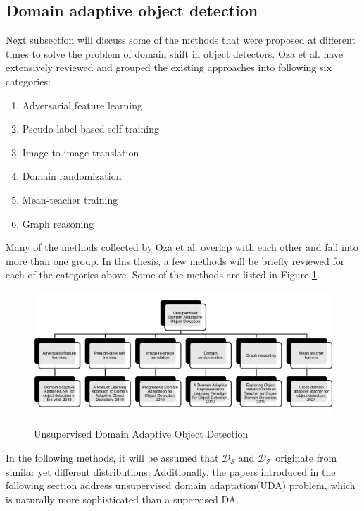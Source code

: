 \documentclass[english, 12pt, a4paper, elec, utf8, a-1b, online]{aaltothesis}
\begin{document}
\subsection{Domain adaptive object detection}
\label{DAobj} 
Next subsection will discuss some of the methods that were proposed at different times to solve the problem of domain shift in object detectors. Oza et al.  \cite{Oza2021} have extensively reviewed and grouped the existing approaches into following six categories:
\begin{enumerate}
	\item Adversarial feature learning
	\item Pseudo-label based self-training
	\item Image-to-image translation
	\item Domain randomization 
	\item Mean-teacher training
	\item Graph reasoning
\end{enumerate} 

Many of the methods collected by Oza et al. overlap with each other and fall into more than one group. In this thesis, a few methods will be briefly reviewed for each of the categories above. Some of the methods are listed in Figure \ref{UDA_OD}.

\begin{figure}[htb]
	\begin{center}
		\includegraphics[width=16cm]{./UDA_OD.png}
	\end{center}
	\caption{Unsupervised Domain Adaptive Object Detection}
	\begin{center}
		\label{UDA_OD}
	\end{center}
\end{figure}
\FloatBarrier

In the following methods, it will be assumed that $\mathcal{D_S}$ and $\mathcal{D_T}$ originate from similar yet different distributions. Additionally, the papers introduced in the following section address unsupervised domain adaptation(UDA) problem, which is naturally more sophisticated than a supervised DA.
\end{document}

